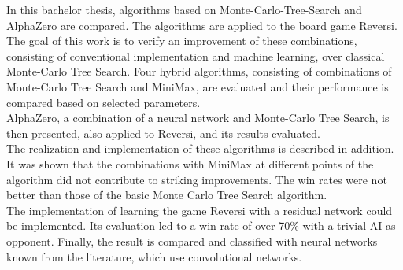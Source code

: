 In this bachelor thesis, algorithms based on Monte-Carlo-Tree-Search and AlphaZero are compared. The algorithms are applied to the board game Reversi. The goal of this work is to verify an improvement of these combinations, consisting of conventional implementation and machine learning, over classical Monte-Carlo Tree Search. Four hybrid algorithms, consisting of combinations of Monte-Carlo Tree Search and MiniMax, are evaluated and their performance is compared based on selected parameters.\\
AlphaZero, a combination of a neural network and Monte-Carlo Tree Search, is then presented, also applied to Reversi, and its results evaluated.\\
The realization and implementation of these algorithms is described in addition.\\
It was shown that the combinations with MiniMax at different points of the algorithm did not contribute to striking improvements. The win rates were not better than those of the basic Monte Carlo Tree Search algorithm.\\
The implementation of learning the game Reversi with a residual network could be implemented. Its evaluation led to a win rate of over 70\% with a trivial AI as opponent. Finally, the result is compared and classified with neural networks known from the literature, which use convolutional networks.